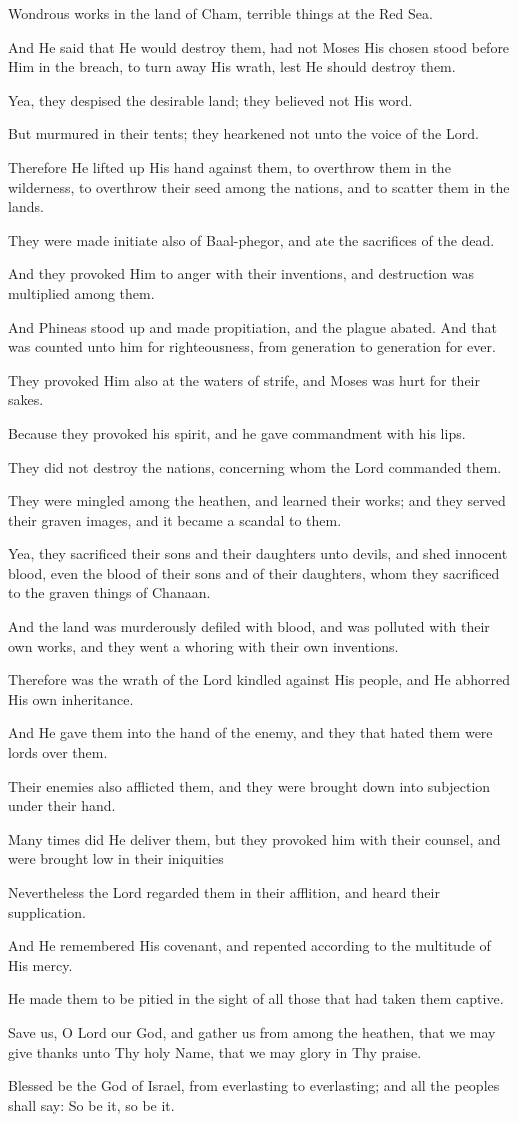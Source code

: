 Wondrous works in the land of Cham, terrible things at the Red Sea.

And He said that He would destroy them, had not Moses His chosen stood before Him in the breach, to turn away His wrath, lest He should destroy them.

Yea, they despised the desirable land; they believed not His
word.

But murmured in their tents; they hearkened not unto the voice of the Lord.

Therefore He lifted up His hand against them, to overthrow them in the wilderness, to overthrow their seed among the nations, and to scatter them in the lands.

They were made initiate also of Baal-phegor, and ate the sacrifices of the dead.

And they provoked Him to anger with their inventions, and destruction was multiplied among them.

And Phineas stood up and made propitiation, and the plague abated. And that was counted unto him for righteousness, from generation to generation for ever.

They provoked Him also at the waters of strife, and Moses was hurt for their sakes.

Because they provoked his spirit, and he gave commandment with his lips.

They did not destroy the nations, concerning whom the Lord commanded them.

They were mingled among the heathen, and learned their works; and they served their graven images, and it became a scandal to them.

Yea, they sacrificed their sons and their daughters unto devils, and shed innocent blood, even the blood of their sons and of their daughters, whom they sacrificed to the graven things of Chanaan.

And the land was murderously defiled with blood, and was polluted with their own works, and they went a whoring with their own inventions.

Therefore was the wrath of the Lord kindled against His people, and He abhorred His own inheritance.

And He gave them into the hand of the enemy, and they that hated them were lords over them.

Their enemies also afflicted them, and they were brought down into subjection under their hand.

Many times did He deliver them, but they provoked him with their counsel, and were brought low in their iniquities

Nevertheless the Lord regarded them in their afflition, and heard their supplication.

And He remembered His covenant, and repented according to the multitude of His mercy.

He made them to be pitied in the sight of all those that had taken them captive.

Save us, O Lord our God, and gather us from among the heathen, that we may give thanks unto Thy holy Name, that we may glory in Thy praise.

Blessed be the God of Israel, from everlasting to everlasting; and all the peoples shall say: So be it, so be it.
